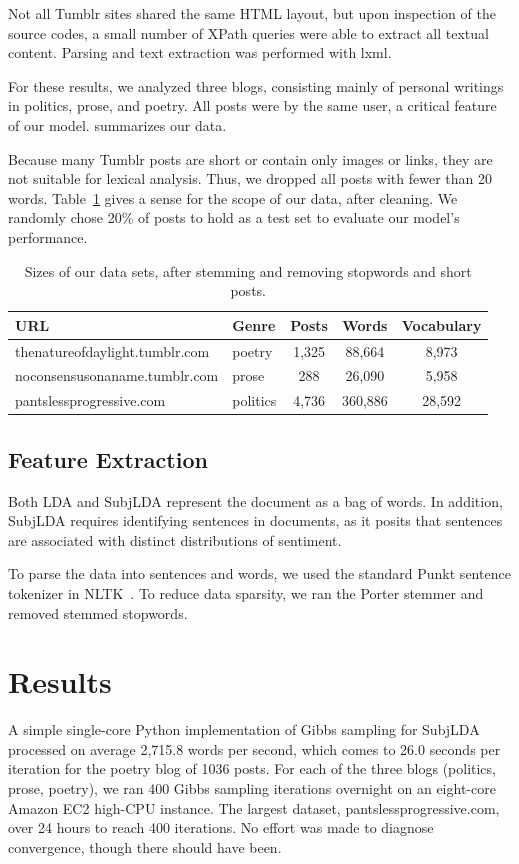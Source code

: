 \documentclass{article}
\begin{document}
Not all Tumblr sites shared the same HTML layout, but upon inspection
of the source codes, a small number of XPath queries were able to
extract all textual content.  Parsing and text extraction was
performed with lxml.

For these results, we analyzed three blogs, consisting mainly of
personal writings in politics, prose, and poetry. All posts were
by the same user, a critical feature of our model. 
summarizes our data.

Because many Tumblr posts are short or contain only images or links,
they are not suitable for lexical analysis. Thus, we dropped all
posts with fewer than 20 words. Table~\ref{tab:data} gives a
sense for the scope of our data, after cleaning. We randomly chose
20\% of posts to hold as a test set to evaluate our model's
performance.

\begin{table} 
\centering
\begin{tabular}{ l l c c c }
\bf URL & \bf Genre & \bf Posts & \bf Words & \bf Vocabulary \\
\hline
thenatureofdaylight.tumblr.com & poetry & 1,325 & 88,664 & 8,973 \\
noconsensusonaname.tumblr.com & prose & 288 & 26,090 & 5,958 \\
pantslessprogressive.com & politics & 4,736 & 360,886 & 28,592 \\
\end{tabular}
\caption{Sizes of our data sets, after stemming and removing stopwords and short posts.\label{tab:data}}
\end{table}

\subsection{Feature Extraction}
Both LDA and SubjLDA represent the document as a bag of words.  In
addition, SubjLDA requires identifying sentences in documents, as
it posits that sentences are associated with distinct distributions
of sentiment.

To parse the data into sentences and words, we used the standard
Punkt sentence tokenizer in NLTK~\citep{bird09}. To reduce data
sparsity, we ran the Porter stemmer and removed stemmed stopwords.

\section{Results} 
A simple single-core Python implementation of Gibbs sampling for
SubjLDA processed on average 2,715.8 words per second, which comes
to 26.0 seconds per iteration for the poetry blog of 1036 posts.
For each of the three blogs (politics, prose, poetry), we ran 400
Gibbs sampling iterations overnight on an eight-core Amazon EC2
high-CPU instance. The largest dataset, pantslessprogressive.com,
over 24 hours to reach 400 iterations. No effort was made to
diagnose convergence, though there should have been.
\end{document}
